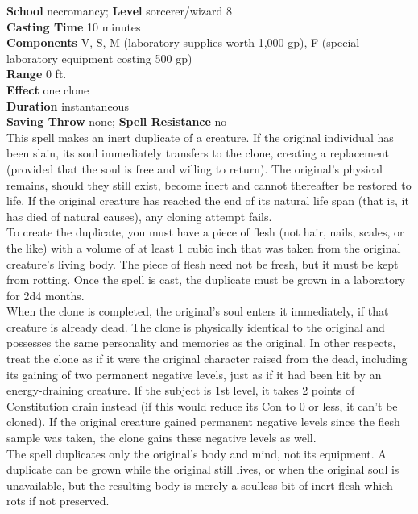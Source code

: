 \textbf{School} necromancy; \textbf{Level} sorcerer/wizard 8\\
\textbf{Casting Time} 10 minutes\\
\textbf{Components} V, S, M (laboratory supplies worth 1,000 gp), F (special laboratory equipment costing 500 gp)\\
\textbf{Range} 0 ft.\\
\textbf{Effect} one clone\\
\textbf{Duration} instantaneous\\
\textbf{Saving Throw} none; \textbf{Spell Resistance} no\\
This spell makes an inert duplicate of a creature. If the original individual has been slain, its soul immediately transfers to the clone, creating a replacement (provided that the soul is free and willing to return). The original's physical remains, should they still exist, become inert and cannot thereafter be restored to life. If the original creature has reached the end of its natural life span (that is, it has died of natural causes), any cloning attempt fails.\\
To create the duplicate, you must have a piece of flesh (not hair, nails, scales, or the like) with a volume of at least 1 cubic inch that was taken from the original creature's living body. The piece of flesh need not be fresh, but it must be kept from rotting. Once the spell is cast, the duplicate must be grown in a laboratory for 2d4 months.\\
When the clone is completed, the original's soul enters it immediately, if that creature is already dead. The clone is physically identical to the original and possesses the same personality and memories as the original. In other respects, treat the clone as if it were the original character raised from the dead, including its gaining of two permanent negative levels, just as if it had been hit by an energy-draining creature. If the subject is 1st level, it takes 2 points of Constitution drain instead (if this would reduce its Con to 0 or less, it can't be cloned). If the original creature gained permanent negative levels since the flesh sample was taken, the clone gains these negative levels as well.\\
The spell duplicates only the original's body and mind, not its equipment. A duplicate can be grown while the original still lives, or when the original soul is unavailable, but the resulting body is merely a soulless bit of inert flesh which rots if not preserved.\\
